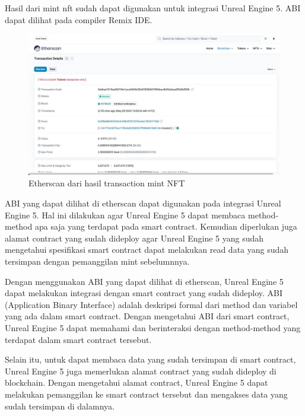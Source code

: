 Hasil dari mint nft sudah dapat digunakan untuk integrasi Unreal Engine 5. ABI dapat dilihat pada compiler Remix IDE.
\begin{figure}[H]
  \centering

  \includegraphics[scale=0.35]{gambar/etherscan-deploy.jpg}

  \caption{Etherscan dari hasil transaction mint NFT}
  \label{fig:etherscandeploy}
\end{figure}

ABI yang dapat dilihat di etherscan dapat digunakan pada integrasi Unreal Engine 5. Hal ini dilakukan agar
Unreal Engine 5 dapat membaca method-method apa saja yang terdapat pada smart contract. Kemudian diperlukan juga
alamat contract yang sudah dideploy agar Unreal Engine 5 yang sudah mengetahui spesifikasi smart contract dapat melakukan read data
yang sudah tersimpan dengan pemanggilan mint sebelumnnya.

Dengan menggunakan ABI yang dapat dilihat di etherscan, Unreal Engine 5 dapat melakukan integrasi dengan smart contract yang sudah dideploy. ABI (Application Binary Interface) adalah deskripsi formal dari method dan variabel yang ada dalam smart contract. Dengan mengetahui ABI dari smart contract, Unreal Engine 5 dapat memahami dan berinteraksi dengan method-method yang terdapat dalam smart contract tersebut.

Selain itu, untuk dapat membaca data yang sudah tersimpan di smart contract, Unreal Engine 5 juga memerlukan alamat contract yang sudah dideploy di blockchain. Dengan mengetahui alamat contract, Unreal Engine 5 dapat melakukan pemanggilan ke smart contract tersebut dan mengakses data yang sudah tersimpan di dalamnya.

